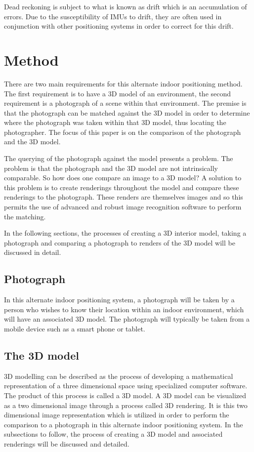 \documentclass[11pt,a4paper]{report}
\begin{document}
		Dead reckoning is subject to what is known as drift which is an accumulation of errors. Due to the susceptibility of IMUs to drift, they are often used in conjunction with other positioning systems in order to correct for this drift.

\newpage
\chapter{Method}
	There are two main requirements for this alternate indoor positioning method. The first requirement is to have a 3D model of an environment, the second requirement is a photograph of a scene within that environment. The premise is that the photograph can be matched against the 3D model in order to determine where the photograph was taken within that 3D model, thus locating the photographer. The focus of this paper is on the comparison of the photograph and the 3D model.
	
	The querying of the photograph against the model presents a problem. The problem is that the photograph and the 3D model are not intrinsically comparable. So how does one compare an image to a 3D model? A solution to this problem is to create renderings throughout the model and compare these renderings to the photograph. These renders are themselves images and so this permits the use of advanced and robust image recognition software to perform the matching.
	
	In the following sections, the processes of creating a 3D interior model, taking a photograph and comparing a photograph to renders of the 3D model will be discussed in detail.
	
	\section{Photograph}
		In this alternate indoor positioning system, a photograph will be taken by a person who wishes to know their location within an indoor environment, which will have an associated 3D model. The photograph will typically be taken from a mobile device such as a smart phone or tablet.
	
	\newpage
	\section{The 3D model}
		3D modelling can be described as the process of developing a mathematical representation of a three dimensional space using specialized computer software. The product of this process is called a 3D model. A 3D model can be visualized as a two dimensional image through a process called 3D rendering. It is this two dimensional image representation which is utilized in order to perform the comparison to a photograph in this alternate indoor positioning system. In the subsections to follow, the process of creating a 3D model and associated renderings will be discussed and detailed.
		
\end{document}
